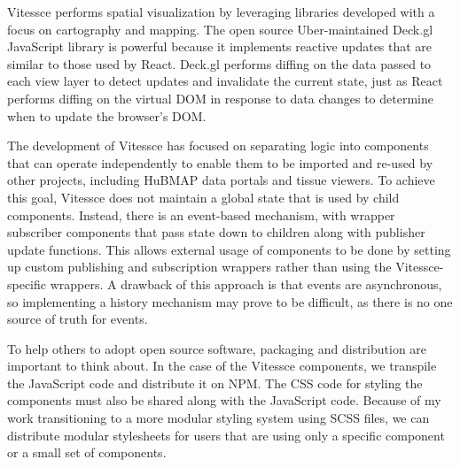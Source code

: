 \documentclass[12pt, letterpaper]{article}
\begin{document}
Vitessce performs spatial visualization by leveraging libraries developed with a focus on cartography and mapping.
The open source Uber-maintained Deck.gl JavaScript library is powerful because it implements reactive updates that are similar to those used by React.
Deck.gl performs diffing on the data passed to each view layer to detect updates and invalidate the current state, just as React performs diffing on the virtual DOM in response to data changes to determine when to update the browser's DOM.

The development of Vitessce has focused on separating logic into components that can operate independently to enable them to be imported and re-used by other projects, including HuBMAP data portals and tissue viewers.
To achieve this goal, Vitessce does not maintain a global state that is used by child components.
Instead, there is an event-based mechanism, with wrapper subscriber components that pass state down to children along with publisher update functions.
This allows external usage of components to be done by setting up custom publishing and subscription wrappers rather than using the Vitessce-specific wrappers.
A drawback of this approach is that events are asynchronous, so implementing a history mechanism may prove to be difficult, as there is no one source of truth for events.

To help others to adopt open source software, packaging and distribution are important to think about.
In the case of the Vitessce components, we transpile the JavaScript code and distribute it on NPM.
The CSS code for styling the components must also be shared along with the JavaScript code.
Because of my work transitioning to a more modular styling system using SCSS files, we can distribute modular stylesheets for users that are using only a specific component or a small set of components.
\end{document}
